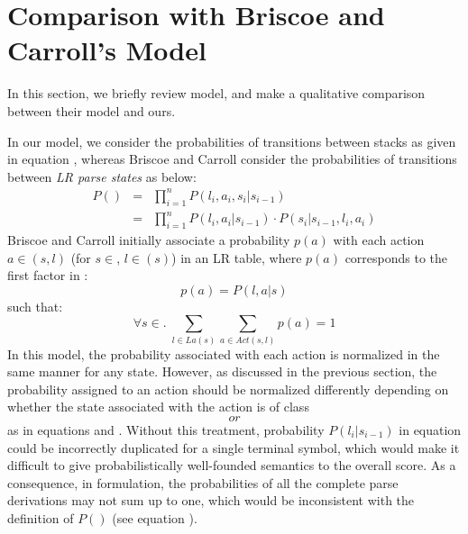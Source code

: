 \documentclass[a4j]{article}
\def\T{}
\def\BC{}
\def\La{}
\def\Act{}
\def\SS{}
\def\Ss{}
\def\Sr{}
\def\eq#1{}
\begin{document}
\section{Comparison with Briscoe and Carroll's Model}
\label{sec:BC-model}

In this section, we briefly review \BC model, and make a qualitative
comparison between their model and ours.

In our model, we consider the probabilities of transitions between
stacks as given in equation \eq{T2}, whereas Briscoe and Carroll
consider the probabilities of transitions between {\it LR parse
states\/} as below:
\begin{eqnarray}
  \label{eq:Briscoe-T0}
  P(\T)&=&\prod_{i=1}^n P(l_i,a_i,s_i|s_{i-1})\\
  \label{eq:Briscoe-T1}
             &=&\prod_{i=1}^n P(l_i,a_i|s_{i-1})\cdot
                              P(s_i|s_{i-1},l_i,a_i)
\end{eqnarray}
Briscoe and Carroll initially associate a probability $p(a)$ with each
action $a\in\Act(s,l)$ (for $s\in\SS$, $l\in\La(s)$) in an LR table,
where $p(a)$ corresponds to the first factor in \eq{Briscoe-T1}:
\begin{equation}
  \label{eq:Briscoe-a0}
  p(a)=P(l,a|s)  
\end{equation}
such that:
\begin{equation}
  \label{eq:Briscoe-a1}
  \forall s\in\SS.\;\sum_{l\in La(s)}\sum_{a\in Act(s,l)}p(a)=1
\end{equation}
In this model, the probability associated with each action is normalized
in the same manner for any state. However, as discussed in the previous
section, the probability assigned to an action should be normalized
differently depending on whether the state associated with the action is
of class $\Ss$ or $\Sr$ as in equations \eq{sum-a1} and
\eq{sum-a2}. Without this treatment, probability $P(l_i|s_{i-1})$ in
equation \eq{l1} could be incorrectly duplicated for a single terminal
symbol, which would make it difficult to give probabilistically
well-founded semantics to the overall score. As a consequence, in \BC
formulation, the probabilities of all the complete parse derivations may
not sum up to one, which would be inconsistent with the definition of
$P(\T)$ (see equation \eq{Tset0}).
\end{document}
